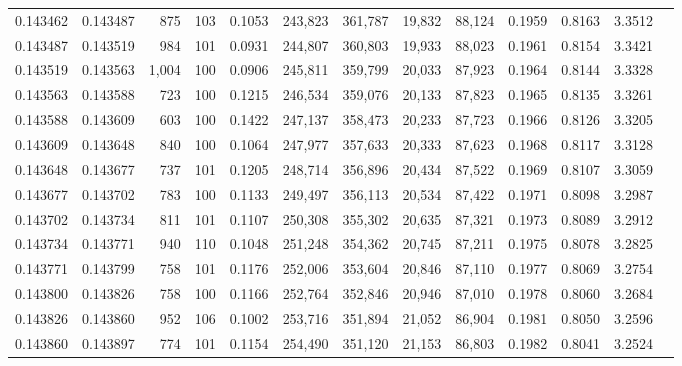 \begin{tabular}{rrrrrrrrrrrrr}
0.143462 & 0.143487 &   875 & 103 &                                     0.1053 & 243,823 & 361,787 &  19,832 &  88,124 & 0.1959 & 0.8163 & 3.3512 \\
0.143487 & 0.143519 &   984 & 101 &                                     0.0931 & 244,807 & 360,803 &  19,933 &  88,023 & 0.1961 & 0.8154 & 3.3421 \\
0.143519 & 0.143563 & 1,004 & 100 &                                     0.0906 & 245,811 & 359,799 &  20,033 &  87,923 & 0.1964 & 0.8144 & 3.3328 \\
0.143563 & 0.143588 &   723 & 100 &                                     0.1215 & 246,534 & 359,076 &  20,133 &  87,823 & 0.1965 & 0.8135 & 3.3261 \\
0.143588 & 0.143609 &   603 & 100 &                                     0.1422 & 247,137 & 358,473 &  20,233 &  87,723 & 0.1966 & 0.8126 & 3.3205 \\
0.143609 & 0.143648 &   840 & 100 &                                     0.1064 & 247,977 & 357,633 &  20,333 &  87,623 & 0.1968 & 0.8117 & 3.3128 \\
0.143648 & 0.143677 &   737 & 101 &                                     0.1205 & 248,714 & 356,896 &  20,434 &  87,522 & 0.1969 & 0.8107 & 3.3059 \\
0.143677 & 0.143702 &   783 & 100 &                                     0.1133 & 249,497 & 356,113 &  20,534 &  87,422 & 0.1971 & 0.8098 & 3.2987 \\
0.143702 & 0.143734 &   811 & 101 &                                     0.1107 & 250,308 & 355,302 &  20,635 &  87,321 & 0.1973 & 0.8089 & 3.2912 \\
0.143734 & 0.143771 &   940 & 110 &                                     0.1048 & 251,248 & 354,362 &  20,745 &  87,211 & 0.1975 & 0.8078 & 3.2825 \\
0.143771 & 0.143799 &   758 & 101 &                                     0.1176 & 252,006 & 353,604 &  20,846 &  87,110 & 0.1977 & 0.8069 & 3.2754 \\
0.143800 & 0.143826 &   758 & 100 &                                     0.1166 & 252,764 & 352,846 &  20,946 &  87,010 & 0.1978 & 0.8060 & 3.2684 \\
0.143826 & 0.143860 &   952 & 106 &                                     0.1002 & 253,716 & 351,894 &  21,052 &  86,904 & 0.1981 & 0.8050 & 3.2596 \\
0.143860 & 0.143897 &   774 & 101 &                                     0.1154 & 254,490 & 351,120 &  21,153 &  86,803 & 0.1982 & 0.8041 & 3.2524 \\

\end{tabular}
